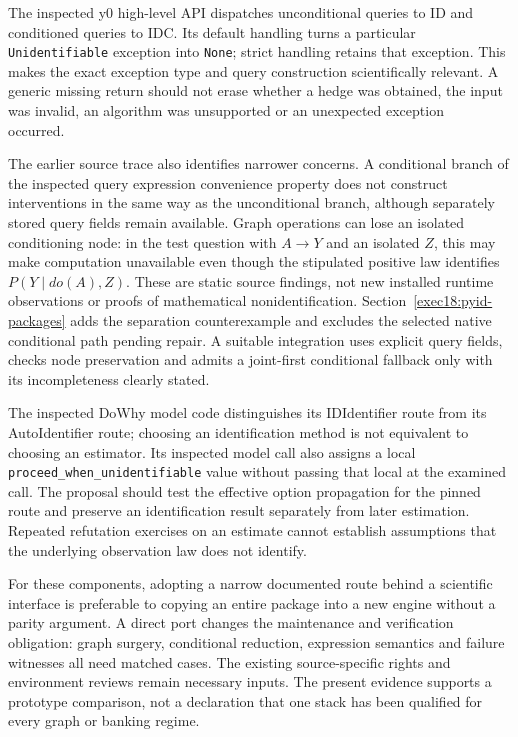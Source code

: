 The inspected y0 high-level API dispatches unconditional
queries to ID and conditioned queries to IDC. Its
default handling turns a particular
\texttt{Unidentifiable} exception into \texttt{None};
strict handling retains that exception. This makes
the exact exception type and query construction
scientifically relevant. A generic missing return
should not erase whether a hedge was obtained, the
input was invalid, an algorithm was unsupported or
an unexpected exception occurred.~\citep{exec13_y0_api,exec13_y0_id,exec13_y0_idc}

The earlier source trace also identifies narrower
concerns. A conditional branch of the inspected query
expression convenience property does not construct
interventions in the same way as the unconditional
branch, although separately stored query fields
remain available. Graph operations can lose an
isolated conditioning node: in the test question
with $A\to Y$ and an isolated $Z$, this may make
computation unavailable even though the stipulated
positive law identifies $P(Y\mid do(A),Z)$.
These are static source findings, not new installed
runtime observations or proofs of mathematical
nonidentification. Section~\ref{exec18:pyid-packages}
adds the separation counterexample and excludes the
selected native conditional path pending repair. A
suitable integration uses explicit query fields,
checks node preservation and admits a joint-first
conditional fallback only with its incompleteness
clearly stated.~\citep{exec13_y0_api,exec13_y0_graph,exec13_y0_dsl,exec13_y0_utils,exec13_y0_rule2,exec13_y0_separation}

The inspected DoWhy model code distinguishes its
IDIdentifier route from its AutoIdentifier route;
choosing an identification method is not equivalent
to choosing an estimator. Its inspected model call
also assigns a local
\texttt{proceed\_when\_unidentifiable} value without
passing that local at the examined call. The proposal
should test the effective option propagation for
the pinned route and preserve an identification
result separately from later estimation. Repeated
refutation exercises on an estimate cannot establish
assumptions that the underlying observation law
does not identify.~\citep{exec13_dowhy}

For these components, adopting a narrow documented
route behind a scientific interface is preferable
to copying an entire package into a new engine
without a parity argument. A direct port changes
the maintenance and verification obligation:
graph surgery, conditional reduction, expression
semantics and failure witnesses all need matched
cases. The existing source-specific rights and
environment reviews remain necessary inputs.
The present evidence supports a prototype comparison,
not a declaration that one stack has been qualified
for every graph or banking regime.

